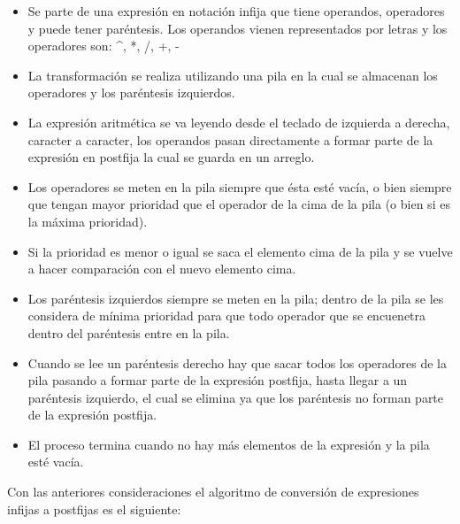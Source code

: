 \begin{itemize}
	\item Se parte de una expresión en notación infija que tiene operandos, operadores y puede tener paréntesis. Los operandos vienen representados por letras y los operadores son: \textasciicircum, *, /, +, -
	\item La transformación se realiza utilizando una pila en la cual se almacenan los operadores y los paréntesis izquierdos.
	\item La expresión aritmética se va leyendo desde el teclado de izquierda a derecha, caracter a caracter, los operandos pasan directamente a formar parte de la expresión en postfija la cual se guarda en un arreglo.
	\item Los operadores se meten en la pila siempre que ésta esté vacía, o bien siempre que tengan mayor prioridad que el operador de la cima de la pila (o bien si es la máxima prioridad).
	\item Si la prioridad es menor o igual se saca el elemento cima de la pila y se vuelve a hacer comparación con el nuevo elemento cima.
	\item Los paréntesis izquierdos siempre se meten en la pila; dentro de la pila se les considera de mínima prioridad para que todo operador que se encuenetra dentro del paréntesis entre en la pila.
	\item Cuando se lee un paréntesis derecho hay que sacar todos los operadores de la pila pasando a formar parte de la expresión postfija, hasta llegar a un paréntesis izquierdo, el cual se elimina ya que los paréntesis no forman parte de la expresión postfija.
	\item El proceso termina cuando no hay más elementos de la expresión y la pila esté vacía.
\end{itemize}

Con las anteriores consideraciones el algoritmo de conversión de expresiones infijas a postfijas es el siguiente:

